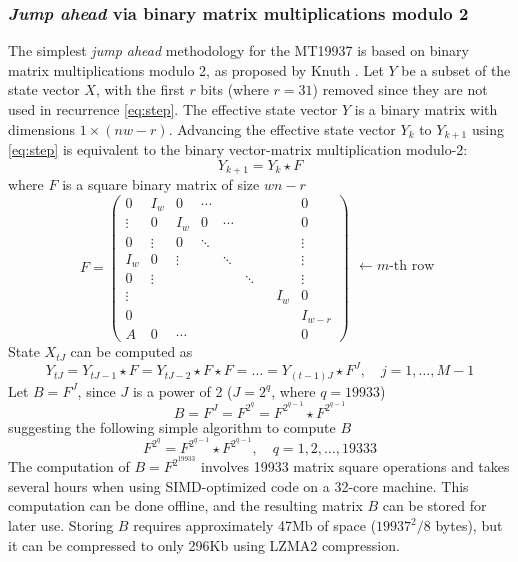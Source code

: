 \documentclass[preprint,1p,times]{elsarticle}
\begin{document}
	\subsubsection{\textit{Jump ahead} via binary matrix multiplications modulo 2}
	\label{sec:jumpahead}
	The simplest \textit{jump ahead} methodology for the MT19937 is based on binary matrix multiplications modulo 2, as proposed by Knuth \cite{knuth}. Let $Y$ be a subset of the state vector $X$, with the first $r$ bits (where $r = 31$) removed since they are not used in recurrence \eqref{eq:step}. 
	The effective state vector $Y$ is a binary matrix with dimensions $1\times (nw-r)$. Advancing the effective state vector $Y_k$ to $Y_{k+1}$ using \eqref{eq:step} is equivalent to the binary vector-matrix multiplication modulo-2:
	\begin{equation}
		Y_{k+1} = Y_k \star F
	\end{equation}
	where $F$ is a square binary matrix of size $wn-r$
	\begin{equation}
		\label{eq:transmat}
		F = \begin{pmatrix}
			0 & I_w & 0 & \cdots & &  &  &  & 0 \\
			\vdots & 0 & I_w & 0 & \cdots & & & & 0\\
			0 & \vdots & 0 & \ddots & &&& & \vdots \\
			I_w & 0 & \vdots & & \ddots & && & \vdots \\
			0 & \vdots &  & & & \ddots & & & \vdots \\
			\vdots &  &  &  & &&& I_w & 0 \\
			0 &  &  & &  & &&&I_{w - r} \\
			A & 0 & \cdots & &  &  &&& 0
		\end{pmatrix}
		\begin{matrix}
			\\ \\ \\ \leftarrow m\text{-th row} \\ \\ \\ \\
		\end{matrix}
	\end{equation}
	State $X_{tJ}$ can be computed as
	\begin{equation}
		\label{eq:jumpahead}
		Y_{tJ} = Y_{tJ-1} \star F = Y_{tJ-2}  \star F \star F = \ldots = Y_{(t-1)J}  \star F^{J}, \quad j=1,\dots,M-1
	\end{equation}
	Let $B=F^J$, since $J$ is a power of 2 ($J=2^{q}$, where $q=19933$)
	$$
	B=F^{J}=F^{2^q}=F^{2^{q-1}} \star F^{2^{q-1}}
	$$
	suggesting the following simple algorithm to compute $B$
	$$
	F^{2^q} = F^{2^{q-1}} \star F^{2^{q-1}}, \quad q=1, 2, \dots, 19333
	$$
	The computation of $B=F^{2^{19933}}$ involves 19933 matrix square operations and takes several hours when using SIMD-optimized code on a 32-core machine. This computation can be done offline, and the resulting matrix $B$ can be stored for later use. Storing $B$ requires approximately 47Mb of space ($19937^2/8$ bytes), but it can be compressed to only 296Kb using LZMA2 compression.
	
\end{document}
